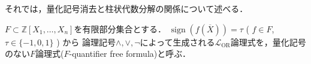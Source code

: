 \documentclass[uplatex, dvipdfmx]{jsarticle}
\makeatletter
\numberwithin{equation}{section}
\renewenvironment{proof}[1][\proofname]{\par
  \pushQED{\qed}%
  \normalfont \topsep6\p@\@plus6\p@\relax
  \trivlist
  \item\relax
  {\bfseries
  #1\@addpunct{.}}\hspace\labelsep\ignorespaces
}{
  \popQED\endtrivlist\@endpefalse
}
\newcommand{\Z}{\mathbb{Z}}
\DeclareMathOperator{\sign}{sign}
\DeclareMathOperator{\CSIGN}{CSIGN}
\theoremstyle{definition}
\newtheorem{proposition}[definition]{命題}
\renewcommand{\proofname}{\textbf{証明}}
\makeatother
\begin{document}




それでは，量化記号消去と柱状代数分解の関係について述べる．

$F \subset \Z[X_1, \dots, X_n]$を有限部分集合とする．
$\sign(f(\overline{X})) = \tau$ ( $f \in F$, $\tau \in \{-1, 0, 1\}$ ) から
論理記号$\land, \lor, \lnot$によって生成される$\mathcal{L}_\mathrm{OR}$論理式を，量化記号のない$F$論理式($F$-quantifier free formula)と呼ぶ．
\end{document}

